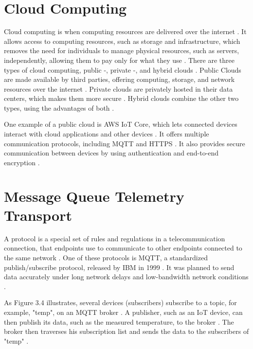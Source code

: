 \section{Cloud Computing}
Cloud computing is when computing resources are delivered over the internet \cite{Investopedia2023}. It allows access to computing resources, such as storage and infrastructure, which removes the need for individuals to manage physical resources, such as servers, independently, allowing them to pay only for what they use \cite{GoogleCloud}. There are three types of cloud computing, public -, private -, and hybrid clouds \cite{GoogleCloud}. Public Clouds are made available by third parties, offering computing, storage, and network resources over the internet \cite{GoogleCloud}. Private clouds are privately hosted in their data centers, which makes them more secure \cite{GoogleCloud}. Hybrid clouds combine the other two types, using the advantages of both \cite{GoogleCloud}.

One example of a public cloud is AWS IoT Core, which lets connected devices interact with cloud applications and other devices \cite{EMQTechnologies}. It offers multiple communication protocols, including MQTT and HTTPS \cite{AWS}. It also provides secure communication between devices by using authentication and end-to-end encryption \cite{AWS}.

\section{Message Queue Telemetry Transport}
A protocol is a special set of rules and regulations in a telecommunication connection, that endpoints use to communicate to other endpoints connected to the same network \cite{Kraijak2015}. 
One of these protocols is MQTT, a standardized publish/subscribe protocol, released by IBM in 1999 \cite{Soni2017}. It was planned to send data accurately under long network delays and low-bandwidth network conditions \cite{Soni2017}.

As Figure 3.4 illustrates, several devices (subscribers) subscribe to a topic, for example, "temp", on an MQTT broker \cite{OPC}. A publisher, such as an IoT device, can then publish its data, such as the measured temperature, to the broker \cite{OPC}. The broker then traverses his subscription list and sends the data to the subscribers of "temp" \cite{OPC}.

